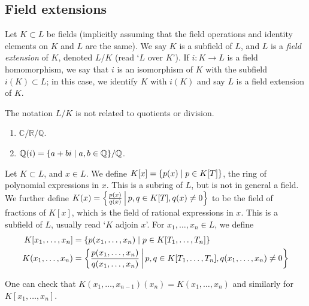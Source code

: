 \subsection{Field extensions}
\begin{definition}
	Let \( K \subset L \) be fields (implicitly assuming that the field operations and identity elements on \( K \) and \( L \) are the same).
	We say \( K \) is a subfield of \( L \), and \( L \) is a \emph{field extension} of \( K \), denoted \( L / K \) (read `\( L \) over \( K \)').
	If \( i \colon K \to L \) is a field homomorphism, we say that \( i \) is an isomorphism of \( K \) with the subfield \( i(K) \subset L \); in this case, we identify \( K \) with \( i(K) \) and say \( L \) is a field extension of \( K \).
\end{definition}
\begin{remark}
	The notation \( L / K \) is not related to quotients or division.
\end{remark}
\begin{example}
	\begin{enumerate}
		\item \( \mathbb C / \mathbb R / \mathbb Q \).
		\item \( \mathbb Q(i) = \qty{a + bi \mid a,b \in \mathbb Q} / \mathbb Q \).
	\end{enumerate}
\end{example}
\begin{definition}
	Let \( K \subset L \), and \( x \in L \).
	We define \( K[x] = \qty{p(x) \mid p \in K[T]} \), the ring of polynomial expressions in \( x \).
	This is a subring of \( L \), but is not in general a field.
	We further define \( K(x) = \qty{\frac{p(x)}{q(x)} \,\middle|\,p,q \in K[T], q(x) \neq 0} \) to be the field of fractions of \( K[x] \), which is the field of rational expressions in \( x \).
	This is a subfield of \( L \), usually read `\( K \) adjoin \( x \)'.
	For \( x_1, \dots, x_n \in L \), we define
	\begin{align*}
		K[x_1, \dots, x_n] &= \qty{p(x_1, \dots, x_n) \mid p \in K[T_1, \dots, T_n]} \\
		K(x_1, \dots, x_n) &= \qty{\frac{p(x_1, \dots, x_n)}{q(x_1, \dots, x_n)} \,\middle|\,p,q \in K[T_1, \dots, T_n], q(x_1, \dots, x_n) \neq 0}
	\end{align*}
\end{definition}
\begin{remark}
	One can check that \( K(x_1, \dots, x_{n-1})(x_n) = K(x_1, \dots, x_n) \) and similarly for \( K[x_1, \dots, x_n] \).
\end{remark}

